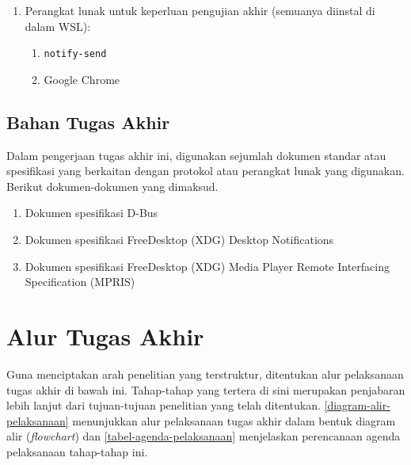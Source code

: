 \begin{enumerate}
    \item Perangkat lunak untuk keperluan pengujian akhir (semuanya diinstal di dalam WSL):
    \begin{enumerate}
        \item \verb|notify-send|
        \item Google Chrome
    \end{enumerate}
\end{enumerate}

\subsection{Bahan Tugas Akhir}

Dalam pengerjaan tugas akhir ini, digunakan sejumlah dokumen standar atau spesifikasi yang berkaitan dengan protokol atau perangkat lunak yang digunakan. Berikut dokumen-dokumen yang dimaksud.
\begin{enumerate}
    \item Dokumen spesifikasi D-Bus \cite{dbus-specification}
    \item Dokumen spesifikasi FreeDesktop (XDG) Desktop Notifications \cite{xdg-desktop-notifications-specification}
    \item Dokumen spesifikasi FreeDesktop (XDG) Media Player Remote Interfacing Specification (MPRIS) \cite{xdg-mpris-specification}
\end{enumerate}


\section{Alur Tugas Akhir}

Guna menciptakan arah penelitian yang terstruktur, ditentukan alur pelaksanaan tugas akhir di bawah ini. Tahap-tahap yang tertera di sini merupakan penjabaran lebih lanjut dari tujuan-tujuan penelitian yang telah ditentukan. \autoref{diagram-alir-pelaksanaan} menunjukkan alur pelaksanaan tugas akhir dalam bentuk diagram alir (\textit{flowchart}) dan \autoref{tabel-agenda-pelaksanaan} menjelaskan perencanaan agenda pelaksanaan tahap-tahap ini.

